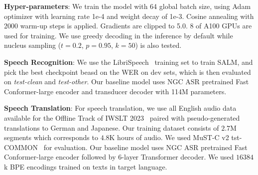 \documentclass{article}
\begin{document}
\textbf{Hyper-parameters}: We train the model with 64 global batch size,  using Adam optimizer with learning rate 1e-4 and weight decay of 1e-3. Cosine annealing with 2000 warm-up steps is applied. Gradients are clipped to 5.0.   8 of A100 GPUs are used for training. We use greedy decoding in the inference by default while nucleus sampling ($t=0.2$, $p=0.95$, $k=50$)\cite{holtzman2019curious} is also tested.



\textbf{Speech Recognition}: We use the LibriSpeech~\cite{panayotov2015librispeech} training set to train SALM, and pick the best checkpoint beasd on the WER on dev sets, which is then evaluated on  \emph{test-clean} and \emph{test-other}. Our baseline model uses  NGC ASR pretrained Fast Conformer-large encoder and transducer decoder with 114M parameters.


\textbf{Speech Translation}: For speech translation, we use all English audio data available for the Offline Track of IWSLT 2023~\cite{iwslt:2023} paired with pseudo-generated translations to German and Japanese. Our training dataset consists of $2.7$M segments which corresponds to $4.8$K hours of audio. We used MuST-C v2 tst-COMMON~\cite{cattoni2021must} for evaluation. Our baseline model uses NGC ASR pretrained Fast Conformer-large encoder followed by $6$-layer Transformer decoder. We used $16384$k BPE encodings trained on texts in target language.
\end{document}
